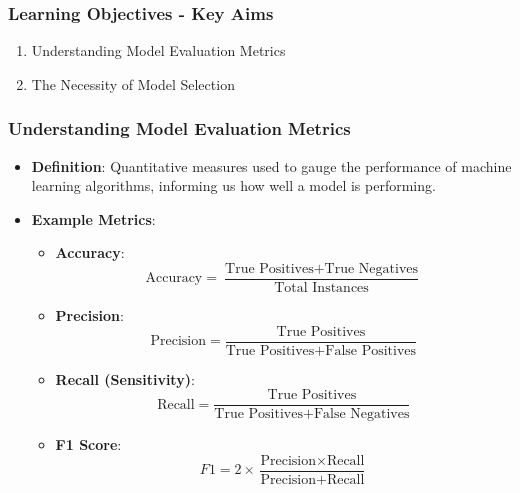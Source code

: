 \documentclass{beamer}
\begin{document}
\begin{frame}[fragile]
    \frametitle{Learning Objectives - Key Aims}
    \begin{enumerate}
        \item Understanding Model Evaluation Metrics
        \item The Necessity of Model Selection
    \end{enumerate}
\end{frame}

\begin{frame}[fragile]
    \frametitle{Understanding Model Evaluation Metrics}
    \begin{itemize}
        \item \textbf{Definition}: Quantitative measures used to gauge the performance of machine learning algorithms, informing us how well a model is performing.
        \item \textbf{Example Metrics}:
            \begin{itemize}
                \item \textbf{Accuracy}:
                \begin{equation}
                \text{Accuracy} = \frac{\text{True Positives} + \text{True Negatives}}{\text{Total Instances}}
                \end{equation}
                \item \textbf{Precision}:
                \begin{equation}
                \text{Precision} = \frac{\text{True Positives}}{\text{True Positives} + \text{False Positives}}
                \end{equation}
                \item \textbf{Recall (Sensitivity)}:
                \begin{equation}
                \text{Recall} = \frac{\text{True Positives}}{\text{True Positives} + \text{False Negatives}}
                \end{equation}
                \item \textbf{F1 Score}:
                \begin{equation}
                F1 = 2 \times \frac{\text{Precision} \times \text{Recall}}{\text{Precision} + \text{Recall}}
                \end{equation}
            \end{itemize}
    \end{itemize}
\end{frame}
\end{document}
